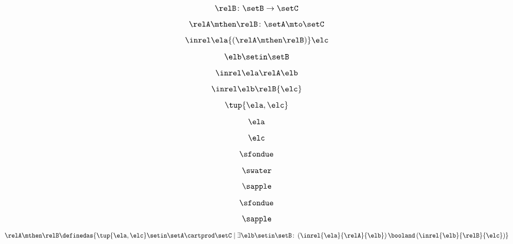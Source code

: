 \begin{forslides}
    \begin{equation}\label{eq:slides_session2_rel_84}
        \relB \colon \setB \to \setC
    \end{equation}
    \begin{equation}\label{eq:slides_session2_rel_85}
        \relA \mthen \relB \colon \setA \mto \setC
    \end{equation}
    \begin{equation}\label{eq:slides_session2_rel_86}
        \inrel \ela {(\relA \mthen \relB)} \elc
    \end{equation}
    \begin{equation}\label{eq:slides_session2_rel_87}
        \elb \setin \setB
    \end{equation}
    \begin{equation}\label{eq:slides_session2_rel_88}
        \inrel \ela \relA \elb
    \end{equation}
    \begin{equation}\label{eq:slides_session2_rel_89}
        \inrel \elb \relB{\elc}
    \end{equation}
    \begin{equation}\label{eq:slides_session2_rel_90}
        \tup{\ela,\elc}
    \end{equation}
    \begin{equation}\label{eq:slides_session2_rel_91}
        \ela
    \end{equation}
    \begin{equation}\label{eq:slides_session2_rel_92}
        \elc
    \end{equation}
    \begin{equation}\label{eq:slides_session2_rel_93}
        \sfondue
    \end{equation}
    \begin{equation}\label{eq:slides_session2_rel_94}
        \swater
    \end{equation}
    \begin{equation}\label{eq:slides_session2_rel_95}
        \sapple
    \end{equation}
    \begin{equation}\label{eq:slides_session2_rel_96}
        \sfondue
    \end{equation}
    \begin{equation}\label{eq:slides_session2_rel_97}
        \sapple
    \end{equation}
    \begin{equation}\label{eq:slides_session2_rel_98}
        \relA \mthen \relB \definedas \{\tup{\ela,\elc} \setin \setA \cartprod \setC \mid  \exists \elb \setin \setB \colon \left(\inrel{\ela}{\relA}{\elb} \right) \booland \left(\inrel{\elb}{\relB}{\elc}\right)\}
    \end{equation}


\end{forslides}
